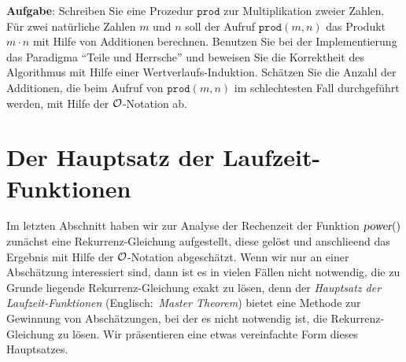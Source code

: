 \noindent
\textbf{Aufgabe}:
Schreiben Sie eine Prozedur $\mathtt{prod}$ zur Multiplikation zweier Zahlen.
F\"ur zwei nat\"urliche Zahlen $m$ und $n$ soll der Aufruf $\mathtt{prod}(m, n)$  das Produkt
$m\cdot n$ mit Hilfe von Additionen
berechnen.  Benutzen Sie bei der Implementierung das Paradigma ``Teile und Herrsche'' und
beweisen Sie die Korrektheit des Algorithmus mit Hilfe einer Wertverlaufs-Induktion.
Sch\"atzen  Sie die Anzahl der Additionen, die beim Aufruf von $\mathtt{prod}(m,n)$
im schlechtesten Fall durchgef\"uhrt werden, mit Hilfe der $\mathcal{O}$-Notation ab. 
\pagebreak

\section{Der Hauptsatz der Laufzeit-Funktionen}
Im letzten Abschnitt haben wir zur Analyse der Rechenzeit der Funktion $\textsl{power}()$
zun\"achst eine Rekurrenz-Gleichung aufgestellt, diese gel\"ost und anschlie\3end das Ergebnis
mit Hilfe der $\mathcal{O}$-Notation abgesch\"atzt.  Wenn wir nur an einer Absch\"atzung interessiert
sind, dann ist es in vielen F\"allen nicht notwendig, die zu Grunde liegende
Rekurrenz-Gleichung exakt zu l\"osen, denn der \textsl{Hauptsatz der Laufzeit-Funktionen}
(Englisch:~\textsl{Master Theorem}) \cite{cormen:01} bietet eine Methode zur Gewinnung von Absch\"atzungen,
bei der es nicht notwendig ist, die Rekurrenz-Gleichung zu l\"osen.  
Wir pr\"asentieren eine etwas vereinfachte Form dieses Hauptsatzes.

